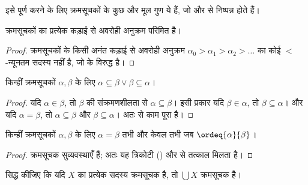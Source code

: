 \documentclass[../../../include/open-logic-section]{subfiles}
\begin{document}
इसे पूर्ण करने के लिए क्रमसूचकों के कुछ और मूल गुण ये हैं, जो
 और  से निष्पन्न होते हैं।

\begin{prop}
क्रमसूचकों का प्रत्येक कड़ाई से अवरोही अनुक्रम परिमित है।
\end{prop}

\begin{proof}
क्रमसूचकों के किसी अनंत कड़ाई से अवरोही अनुक्रम
$\alpha_0 > \alpha_1 > \alpha_2 > \ldots$ का कोई $<$-न्यूनतम सदस्य नहीं
है, जो  के विरुद्ध है।
\end{proof}

\begin{prop}
किन्हीं क्रमसूचकों $\alpha, \beta$ के लिए
$\alpha \subseteq \beta \lor \beta \subseteq \alpha$।
\end{prop}

\begin{proof}
यदि $\alpha \in \beta$, तो $\beta$ की संक्रमणशीलता से
$\alpha \subseteq \beta$। इसी प्रकार यदि $\beta \in \alpha$, तो
$\beta \subseteq \alpha$। और यदि $\alpha = \beta$, तो
$\alpha \subseteq \beta$ और $\beta \subseteq \alpha$। अतः
 से काम पूरा है।
\end{proof}

\begin{prop}
किन्हीं क्रमसूचकों $\alpha, \beta$ के लिए $\alpha = \beta$ तभी और केवल
तभी जब $\ordeq{\alpha}{\beta}$।
\end{prop}

\begin{proof}
क्रमसूचक सुव्यवस्थाएँ हैं; अतः यह त्रिकोटी
() और  से तत्काल
मिलता है।
\end{proof}

\begin{prob}
सिद्ध कीजिए कि यदि $X$ का प्रत्येक सदस्य क्रमसूचक है, तो $\bigcup X$
क्रमसूचक है।
\end{prob}
\end{document}
